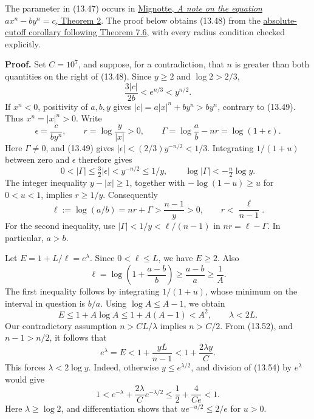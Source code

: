 \documentclass[
  11pt,
  a4paper,
]{article}
\begin{document}
The parameter in (13.47) occurs in
\href{https://www.impan.pl/shop/en/publication/transaction/download/product/109013}{Mignotte,
\emph{A note on the equation} \(ax^n-by^n=c\), Theorem 2}. The proof
below obtains (13.48) from the
\href{https://kokunoyumeto.github.io/open-math-courses-public/courses/TR-BAKER/TR-BAKER-07.html\#an-absolute-cutoff-including-dependent-bases}{absolute-cutoff
corollary following Theorem 7.6}, with every radius condition checked
explicitly.

\textbf{Proof.} Set \(C=10^7\), and suppose, for a contradiction, that
\(n\) is greater than both quantities on the right of (13.48). Since
\(y\ge2\) and \(\log2>2/3\), \[
\frac{3|c|}{2b}<e^{n/3}<y^{n/2}.
\tag{13.49}
\] If \(x^n<0\), positivity of \(a,b,y\) gives \(|c|=a|x|^n+by^n>by^n\),
contrary to (13.49). Thus \(x^n=|x|^n>0\). Write \[
\epsilon=\frac{c}{by^n},\qquad
r=\log\frac{y}{|x|}>0,\qquad
\Gamma=\log\frac ab-nr=\log(1+\epsilon).
\tag{13.50}
\] Here \(\Gamma\ne0\), and (13.49) gives
\(|\epsilon|<(2/3)y^{-n/2}<1/3\). Integrating \(1/(1+u)\) between zero
and \(\epsilon\) therefore gives \[
0<|\Gamma|\le\tfrac32|\epsilon|<y^{-n/2}\le1/y,
\qquad \log|\Gamma|<-\tfrac n2\log y.
\tag{13.51}
\] The integer inequality \(y-|x|\ge1\), together with
\(-\log(1-u)\ge u\) for \(0<u<1\), implies \(r\ge1/y\). Consequently \[
\ell:=\log(a/b)=nr+\Gamma>\frac{n-1}{y}>0,
\qquad r<\frac{\ell}{n-1}.
\tag{13.52}
\] For the second inequality, use \(|\Gamma|<1/y<\ell/(n-1)\) in
\(nr=\ell-\Gamma\). In particular, \(a>b\).

Let \(E=1+L/\ell=e^\lambda\). Since \(0<\ell\le L\), we have \(E\ge2\).
Also \[
\ell=\log\left(1+\frac{a-b}{b}\right)
\ge\frac{a-b}{a}\ge\frac1A.
\] The first inequality follows by integrating \(1/(1+u)\), whose
minimum on the interval in question is \(b/a\). Using \(\log A\le A-1\),
we obtain \[
E\le1+A\log A\le1+A(A-1)<A^2,
\qquad \lambda<2L.
\tag{13.53}
\] Our contradictory assumption \(n>CL/\lambda\) implies \(n>C/2\). From
(13.52), and \(n-1>n/2\), it follows that \[
e^\lambda=E<1+\frac{yL}{n-1}
<1+\frac{2\lambda y}{C}.
\tag{13.54}
\] This forces \(\lambda<2\log y\). Indeed, otherwise
\(y\le e^{\lambda/2}\), and division of (13.54) by \(e^\lambda\) would
give \[
1<e^{-\lambda}+\frac{2\lambda}{C}e^{-\lambda/2}
\le\frac12+\frac{4}{Ce}<1.
\] Here \(\lambda\ge\log2\), and differentiation shows that
\(u e^{-u/2}\le2/e\) for \(u>0\).
\end{document}
